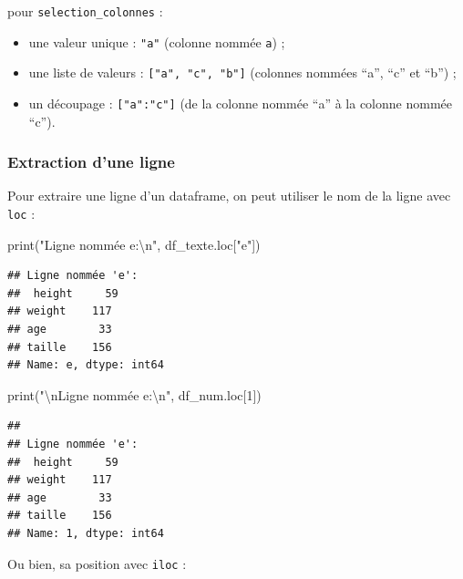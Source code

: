 \documentclass[
  12pt,
]{book}
\newenvironment{Shaded}{\begin{snugshade}}{\end{snugshade}}
\newcommand{\BuiltInTok}[1]{#1}
\newcommand{\CharTok}[1]{\textcolor[rgb]{0.31,0.60,0.02}{#1}}
\newcommand{\DecValTok}[1]{\textcolor[rgb]{0.00,0.00,0.81}{#1}}
\newcommand{\NormalTok}[1]{#1}
\newcommand{\StringTok}[1]{\textcolor[rgb]{0.31,0.60,0.02}{#1}}
\providecommand{\tightlist}{%
  \setlength{\itemsep}{0pt}\setlength{\parskip}{0pt}}
\numberwithin{equation}{section}
\numberwithin{countremarque}{section}
\begin{document}
pour \texttt{selection\_colonnes} :

\begin{itemize}
\tightlist
\item
  une valeur unique : \texttt{"a"} (colonne nommée \texttt{a}) ;
\item
  une liste de valeurs : \texttt{{[}"a",\ "c",\ "b"{]}} (colonnes nommées ``a'', ``c'' et ``b'') ;
\item
  un découpage : \texttt{{[}"a":"c"{]}} (de la colonne nommée ``a'' à la colonne nommée ``c'').
\end{itemize}

\subsubsection{Extraction d'une ligne}\label{extraction-dune-ligne}

Pour extraire une ligne d'un dataframe, on peut utiliser le nom de la ligne avec \texttt{loc} :

\begin{Shaded}
\begin{Highlighting}[]
\BuiltInTok{print}\NormalTok{(}\StringTok{"Ligne nommée \textquotesingle{}e\textquotesingle{}:}\CharTok{\textbackslash{}n}\StringTok{"}\NormalTok{, df\_texte.loc[}\StringTok{"e"}\NormalTok{])}
\end{Highlighting}
\end{Shaded}

\begin{lstlisting}
## Ligne nommée 'e':
##  height     59
## weight    117
## age        33
## taille    156
## Name: e, dtype: int64
\end{lstlisting}

\begin{Shaded}
\begin{Highlighting}[]
\BuiltInTok{print}\NormalTok{(}\StringTok{"}\CharTok{\textbackslash{}n}\StringTok{Ligne nommée \textquotesingle{}e\textquotesingle{}:}\CharTok{\textbackslash{}n}\StringTok{"}\NormalTok{, df\_num.loc[}\DecValTok{1}\NormalTok{])}
\end{Highlighting}
\end{Shaded}

\begin{lstlisting}
## 
## Ligne nommée 'e':
##  height     59
## weight    117
## age        33
## taille    156
## Name: 1, dtype: int64
\end{lstlisting}

Ou bien, sa position avec \texttt{iloc} :
\end{document}
